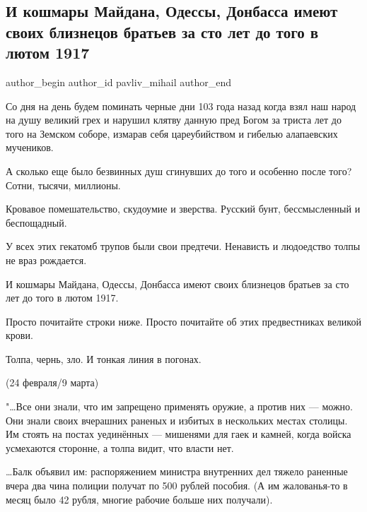  
 
 
 
 
 
\subsection{И кошмары Майдана, Одессы, Донбасса имеют своих близнецов братьев за сто лет до того в лютом 1917}
\label{sec:14_07_2021.fb.pavliv_mihail.1.istoria_1917}
 
\ifcmt
 author_begin
   author_id pavliv_mihail
 author_end
\fi

Со дня на день будем поминать черные дни 103 года назад когда взял наш народ на
душу великий грех и нарушил клятву данную пред Богом за триста лет до того на
Земском соборе, измарав себя цареубийством и гибелью алапаевских мучеников.

А сколько еще было безвинных душ сгинувших до того и особенно после того?
Сотни, тысячи, миллионы.

Кровавое помешательство, скудоумие и зверства. Русский бунт, бессмысленный и
беспощадный.

У всех этих гекатомб трупов были свои предтечи. Ненависть и людоедство толпы не
враз рождается.

И кошмары Майдана, Одессы, Донбасса имеют своих близнецов братьев за сто лет до
того в лютом 1917.

Просто почитайте строки ниже. Просто почитайте об этих предвестниках великой
крови.

Толпа, чернь, зло. И тонкая линия в погонах. 

(24 февраля/9 марта)

"…Все они знали, что им запрещено применять оружие, а против них — можно. Они
знали своих вчерашних раненых и избитых в нескольких местах столицы. Им стоять
на постах уединённых — мишенями для гаек и камней, когда войска усмехаются
сторонне, а толпа видит, что власти нет.

…Балк объявил им: распоряжением министра внутренних дел тяжело раненные вчера
два чина полиции получат по 500 рублей пособия. (А им жалованья-то в месяц было
42 рубля, многие рабочие больше них получали).

